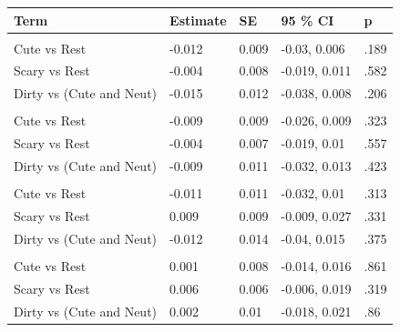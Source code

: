 \documentclass[
  man,
  longtable,
  nolmodern,
  notxfonts,
  notimes,
  colorlinks=true,linkcolor=blue,citecolor=blue,urlcolor=blue]{apa7}
\begin{document}
\begin{table}

{\caption{{Orthogonal contrasts regression analysis for recognition
memory tasks.}{\label{tbl-contrasts-recog}}}
\vspace{-20pt}}

\begin{longtable*}[t]{lllll}
\toprule
Term & Estimate & SE & 95 \% CI & p\\
\midrule
\addlinespace[0.3em]
\\
\hspace{1em}Cute vs Rest & -0.012 & 0.009 & -0.03, 0.006 & .189\\
\hspace{1em}Scary vs Rest & -0.004 & 0.008 & -0.019, 0.011 & .582\\
\hspace{1em}Dirty vs (Cute and Neut) & -0.015 & 0.012 & -0.038, 0.008 & .206\\
\addlinespace[0.3em]
\\
\hspace{1em}Cute vs Rest & -0.009 & 0.009 & -0.026, 0.009 & .323\\
\hspace{1em}Scary vs Rest & -0.004 & 0.007 & -0.019, 0.01 & .557\\
\hspace{1em}Dirty vs (Cute and Neut) & -0.009 & 0.011 & -0.032, 0.013 & .423\\
\addlinespace[0.3em]
\\
\hspace{1em}Cute vs Rest & -0.011 & 0.011 & -0.032, 0.01 & .313\\
\hspace{1em}Scary vs Rest & 0.009 & 0.009 & -0.009, 0.027 & .331\\
\hspace{1em}Dirty vs (Cute and Neut) & -0.012 & 0.014 & -0.04, 0.015 & .375\\
\addlinespace[0.3em]
\\
\hspace{1em}Cute vs Rest & 0.001 & 0.008 & -0.014, 0.016 & .861\\
\hspace{1em}Scary vs Rest & 0.006 & 0.006 & -0.006, 0.019 & .319\\
\hspace{1em}Dirty vs (Cute and Neut) & 0.002 & 0.01 & -0.018, 0.021 & .86\\
\bottomrule
\end{longtable*}

\end{table}
\end{document}
